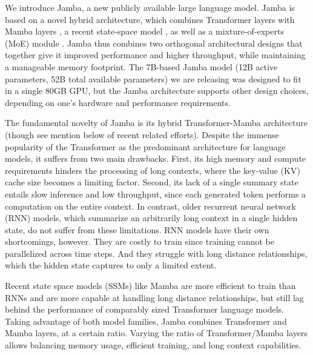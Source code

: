 \documentclass{article}
\def\jamba{Jamba\xspace}
\begin{document}
We introduce \jamba, a new publicly available large language model. \jamba is based on  a novel hybrid architecture, which combines Transformer layers \cite{vaswani2017attention} with Mamba layers \cite{gu2023mamba}, a recent state-space model \cite{gu2021combining,gu2021efficiently}, as well as a mixture-of-experts (MoE) module \cite{shazeer2016outrageously,fedus2022switch}. \jamba thus combines two orthogonal architectural designs that together give it improved performance and higher throughput, while maintaining a manageable memory footprint. The 7B-based \jamba model (12B active parameters, 52B total available parameters) we are releasing was designed to fit in a single 80GB GPU, but the \jamba architecture supports other design choices, depending on one's hardware and performance requirements.  

The fundamental novelty of \jamba is its hybrid Transformer-Mamba architecture (though see mention below of  recent related efforts). Despite the immense popularity of the Transformer as the predominant architecture for language models, it suffers from two main drawbacks. First, its high memory and compute requirements hinders the processing of long contexts, where the key-value (KV) cache size becomes a limiting factor. Second, its lack of a single summary state entails slow inference and low throughput, since each generated token performs a computation on the entire context. In contrast, older recurrent neural network (RNN) models, which summarize an arbitrarily long context in a single hidden state, do not suffer from these limitations. RNN models have their own shortcomings, however. They are costly to train since training cannot be parallelized across time steps. And they struggle with long distance relationships, which the hidden state captures to only a limited extent. 

Recent state space models (SSMs) like Mamba are more efficient to train than RNNs and are more capable at handling long distance relationships, but still lag behind the performance of comparably sized Transformer language models. Taking advantage of both model families, \jamba combines Transformer and Mamba layers, at a certain ratio. Varying the ratio of Transformer/Mamba layers allows balancing memory usage, efficient training, and long context capabilities.  
\end{document}
